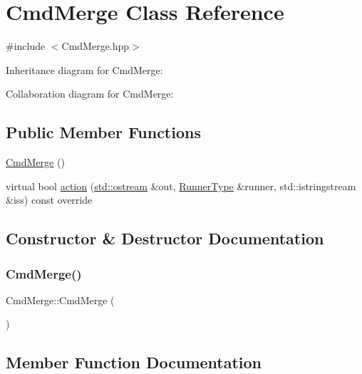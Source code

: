 \hypertarget{classCmdMerge}{}\section{Cmd\+Merge Class Reference}
\label{classCmdMerge}


{\ttfamily \#include $<$Cmd\+Merge.\+hpp$>$}



Inheritance diagram for Cmd\+Merge\+:


Collaboration diagram for Cmd\+Merge\+:
\subsection*{Public Member Functions}
\begin{DoxyCompactItemize}
\item 
\hyperlink{classCmdMerge_a3cd75f18eb4269030793dee47d24a983}{Cmd\+Merge} ()
\item 
virtual bool \hyperlink{classCmdMerge_a426f4d5c54b67471fff531adb8010fb8}{action} (\hyperlink{doctest_8h_a116af65cb5e924b33ad9d9ecd7a783f3}{std\+::ostream} \&out, \hyperlink{Command_8hpp_ad45c3de597c2023a8be0399d914161f4}{Runner\+Type} \&runner, std\+::istringstream \&iss) const override
\end{DoxyCompactItemize}


\subsection{Constructor \& Destructor Documentation}
\mbox{\label{classCmdMerge_a3cd75f18eb4269030793dee47d24a983}} 
\subsubsection{\texorpdfstring{Cmd\+Merge()}{CmdMerge()}}
{\footnotesize\ttfamily Cmd\+Merge\+::\+Cmd\+Merge (\begin{DoxyParamCaption}{ }\end{DoxyParamCaption})}



\subsection{Member Function Documentation}
\mbox{\label{classCmdMerge_a426f4d5c54b67471fff531adb8010fb8}} 

